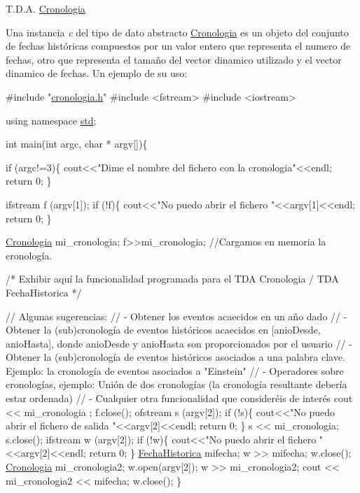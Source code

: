 T.\+D.\+A. \hyperlink{classCronologia}{Cronologia}

Una instancia {\itshape c} del tipo de dato abstracto {\ttfamily \hyperlink{classCronologia}{Cronologia}} es un objeto del conjunto de fechas históricas compuestos por un valor entero que representa el numero de fechas, otro que representa el tamaño del vector dinamico utilizado y el vector dinamico de fechas. Un ejemplo de su uso\+: 
\begin{DoxyCodeInclude}
\textcolor{preprocessor}{#include "\hyperlink{cronologia_8h}{cronologia.h}"}
\textcolor{preprocessor}{#include <fstream>}
\textcolor{preprocessor}{#include <iostream>}

\textcolor{keyword}{using namespace }\hyperlink{namespacestd}{std};

\textcolor{keywordtype}{int} main(\textcolor{keywordtype}{int} argc, \textcolor{keywordtype}{char} * argv[])\{



  \textcolor{keywordflow}{if} (argc!=3)\{
      cout<<\textcolor{stringliteral}{"Dime el nombre del fichero con la cronologia"}<<endl;
      \textcolor{keywordflow}{return} 0;
   \}

   ifstream f (argv[1]);
   \textcolor{keywordflow}{if} (!f)\{
    cout<<\textcolor{stringliteral}{"No puedo abrir el fichero "}<<argv[1]<<endl;
    \textcolor{keywordflow}{return} 0;
   \}
   
   \hyperlink{classCronologia}{Cronologia} mi\_cronologia;
   f>>mi\_cronologia; \textcolor{comment}{//Cargamos en memoria la cronología.}


   \textcolor{comment}{/* Exhibir aquí la funcionalidad programada para el TDA Cronologia / TDA FechaHistorica */} 

   \textcolor{comment}{// Algunas sugerencias: }
   \textcolor{comment}{// - Obtener los eventos acaecidos en un año dado}
   \textcolor{comment}{// - Obtener la (sub)cronología de eventos históricos acaecidos en [anioDesde, anioHasta], donde
       anioDesde y anioHasta son proporcionados por el usuario}
   \textcolor{comment}{// - Obtener la (sub)cronología de eventos históricos asociados a una palabra clave. Ejemplo: la
       cronología de eventos asociados a "Einstein"}
   \textcolor{comment}{// - Operadores sobre cronologías, ejemplo: Unión de dos cronologías (la cronología resultante debería
       estar ordenada)}
   \textcolor{comment}{// - Cualquier otra funcionalidad que consideréis de interés}
   cout << mi\_cronologia ;
   f.close();
   ofstream s (argv[2]);
   \textcolor{keywordflow}{if} (!s)\{
    cout<<\textcolor{stringliteral}{"No puedo abrir el fichero de salida "}<<argv[2]<<endl;
    \textcolor{keywordflow}{return} 0;
   \}
   s << mi\_cronologia;
   s.close();
   ifstream w (argv[2]);
   \textcolor{keywordflow}{if} (!w)\{
    cout<<\textcolor{stringliteral}{"No puedo abrir el fichero "}<<argv[2]<<endl;
    \textcolor{keywordflow}{return} 0;
   \}
   \hyperlink{classFechaHistorica}{FechaHistorica} mifecha;
   w >> mifecha;
   w.close();
   \hyperlink{classCronologia}{Cronologia} mi\_cronologia2;
   w.open(argv[2]);
   w >> mi\_cronologia2;
   cout << mi\_cronologia2 << mifecha;
   w.close();
\}
\end{DoxyCodeInclude}


